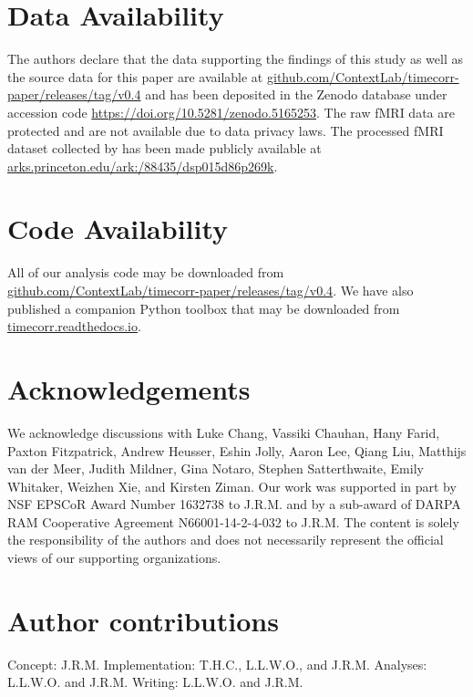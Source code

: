 \documentclass[english]{article}
\begin{document}
\section*{Data Availability}

The authors declare that the data supporting the findings of this
study as well as the source data for this paper are available at
\href{https://github.com/ContextLab/timecorr-paper/releases/tag/v0.4}{github.com/ContextLab/timecorr-paper/releases/tag/v0.4}
and has been deposited in the Zenodo database under accession code \href{https://doi.org/10.5281/zenodo.5165253}{https://doi.org/10.5281/zenodo.5165253}.
The raw fMRI data are protected and are not available due to data
privacy laws. The processed fMRI dataset collected by
\cite{SimoEtal16} has been made publicly available \cite{SimoEtal16b} at
\href{http://arks.princeton.edu/ark:/88435/dsp015d86p269k}{arks.princeton.edu/ark:/88435/dsp015d86p269k}. 

\section*{Code Availability}

All of our analysis code may be downloaded from
\href{https://github.com/ContextLab/timecorr-paper/releases/tag/v0.3}{github.com/ContextLab/timecorr-paper/releases/tag/v0.4}. We have also published a companion Python toolbox that may be downloaded from \href{https://timecorr.readthedocs.io}{timecorr.readthedocs.io}.


\section*{Acknowledgements}
We acknowledge discussions with Luke Chang, Vassiki Chauhan, Hany
Farid, Paxton Fitzpatrick, Andrew Heusser, Eshin Jolly, Aaron Lee,
Qiang Liu, Matthijs van der Meer, Judith Mildner, Gina Notaro, Stephen
Satterthwaite, Emily Whitaker, Weizhen Xie, and Kirsten Ziman. Our
work was supported in part by NSF EPSCoR Award Number 1632738 to
J.R.M. and by a sub-award of DARPA RAM Cooperative Agreement
N66001-14-2-4-032 to J.R.M.  The content is solely the responsibility
of the authors and does not necessarily represent the official views
of our supporting organizations.

\section*{Author contributions}
Concept: J.R.M.  Implementation: T.H.C., L.L.W.O., and J.R.M.
Analyses: L.L.W.O. and J.R.M.  Writing: L.L.W.O. and J.R.M.
\end{document}
